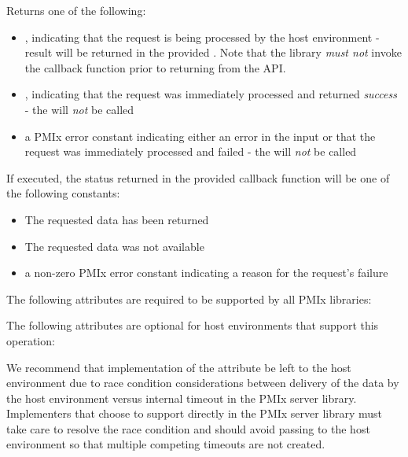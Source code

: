 Returns one of the following:

\begin{itemize}
    \item {}, indicating that the request is being processed by the host environment - result will be returned in the provided . Note that the library \emph{must not} invoke the callback function prior to returning from the \ac{API}.
    \item {}, indicating that the request was immediately processed and returned \textit{success} - the  will \textit{not} be called
    \item a PMIx error constant indicating either an error in the input or that the request was immediately processed and failed - the  will \textit{not} be called
\end{itemize}

If executed, the status returned in the provided callback function will be one of the following constants:

\begin{itemize}
\item {} The requested data has been returned
\item {} The requested data was not available
\item a non-zero \ac{PMIx} error constant indicating a reason for the request's failure
\end{itemize}

\reqattrstart
The following attributes are required to be supported by all \ac{PMIx} libraries:


\reqattrend

\optattrstart
The following attributes are optional for host environments that support this operation:


\optattrend

\adviceimplstart
We recommend that implementation of the  attribute be left to the host environment due to race condition considerations between delivery of the data by the host environment versus internal timeout in the \ac{PMIx} server library. Implementers that choose to support  directly in the \ac{PMIx} server library must take care to resolve the race condition and should avoid passing  to the host environment so that multiple competing timeouts are not created.
\adviceimplend

